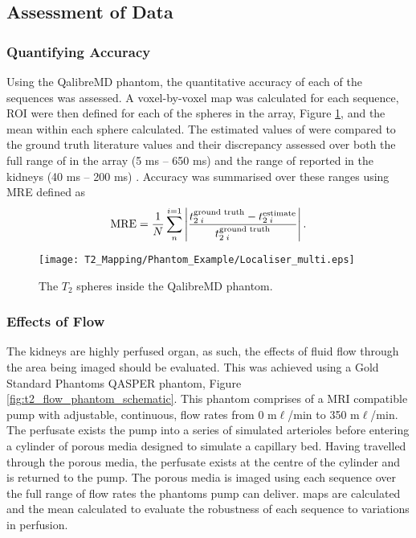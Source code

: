 \subsection{Assessment of Data}

\subsubsection{Quantifying Accuracy}
Using the QalibreMD phantom, the quantitative accuracy of each of the sequences was assessed. A voxel-by-voxel \ttwo map was calculated for each sequence, \ac{ROI} were then defined for each of the spheres in the \ttwo array, Figure \ref{fig:t2_phantom_loc}, and the mean \ttwo within each sphere calculated. The estimated values of \ttwo were compared to the ground truth literature values and their discrepancy assessed over both the full range of \ttwo in the array (5 ms – 650 ms) and the range of \ttwo reported in the kidneys (40 ms – 200 ms) \cite{wolf_magnetic_2018}. Accuracy was summarised over these ranges using \ac{MRE} defined as 
\begin{equation}
	\textup{MRE} = \frac{1}{N}\sum_{n}^{i=1}\left|  \frac{t_{2\; i}^{\textup{ground truth}} - t_{2\; i}^{\textup{estimate}}}{t_{2\; i}^{\textup{ground truth}}}\right|.
	\label{eq:t2_mre}
\end{equation}

\begin{figure}[H]
	\centering
	\texttt{[image: T2\_Mapping/Phantom\_Example/Localiser\_multi.eps]}
	\caption{The $T_2$ spheres inside the QalibreMD phantom.}
	\label{fig:t2_phantom_loc}	
\end{figure}

\subsubsection{Effects of Flow}
The kidneys are highly perfused organ, as such, the effects of fluid flow through the area being imaged should be evaluated. This was achieved using a Gold Standard Phantoms \ac{QASPER} phantom, Figure \ref{fig:t2_flow_phantom_schematic}. This phantom comprises of a \ac{MRI} compatible pump with adjustable, continuous, flow rates from 0 m$\ell$/min to 350 m$\ell$/min. The perfusate exists the pump into a series of simulated arterioles before entering a cylinder of porous media designed to simulate a capillary bed. Having travelled through the porous media, the perfusate exists at the centre of the cylinder and is returned to the pump. The porous media is imaged using each sequence over the full range of flow rates the phantoms pump can deliver. \ttwo maps are calculated and the mean \ttwo calculated to evaluate the robustness of each sequence to variations in perfusion.

